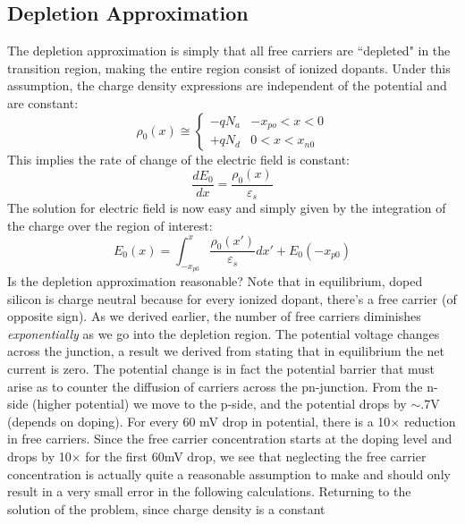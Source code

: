 \subsection{Depletion Approximation}
The depletion approximation is simply that all free carriers are ``depleted" in the transition region, making the entire region consist of ionized dopants.  Under this assumption, the charge density expressions are independent of the potential and are constant:
    \begin{equation}
    {\rho _0}(x) \cong \left\{ 
    	\begin{array}{*{20}{c}}
     		 - q{N_a} &  - {x_{po}} < x < 0\\
     		 + q{N_d} & 0 < x < {x_{n0}}
     \end{array} 
     \right.
    \end{equation}
This implies the rate of change of the electric field is constant:
    \begin{equation} 
        \frac{{d{E_0}}}{{dx}} = \frac{{{\rho _0}(x)}}{{{\varepsilon _s}}}
    \end{equation}
The solution for electric field is now easy and simply given by the integration of the charge over the region of interest:
    \begin{equation}
        {E_0}(x) = \int_{ - {x_{p0}}}^x {\frac{{{\rho _0}(x')}}{{{\varepsilon _s}}}dx'}  + {E_0}( - {x_{p0}}) 
    \end{equation}
Is the depletion approximation reasonable?  Note that in equilibrium, doped silicon is charge neutral because for every ionized dopant, there's a free carrier (of opposite sign).   As we derived earlier, the number of free carriers diminishes \textit{exponentially} as we go into the depletion region.  The potential voltage changes across the junction, a result we derived from stating that in equilibrium the net  current is zero.  The potential change is in fact the potential barrier that must arise as to counter the diffusion of carriers across the pn-junction.   From the n-side (higher potential) we move to the p-side, and the potential drops by $\sim$.7V (depends on doping).  For every 60 mV drop in potential, there is a 10$\times$ reduction in free carriers.  Since the free carrier concentration starts at the doping level and drops by 10$\times$ for the first 60mV drop, we see that neglecting the free carrier concentration is actually quite a reasonable assumption to make and should only result in a very small error in the following calculations.
Returning to the solution of the problem, since charge density is a constant
